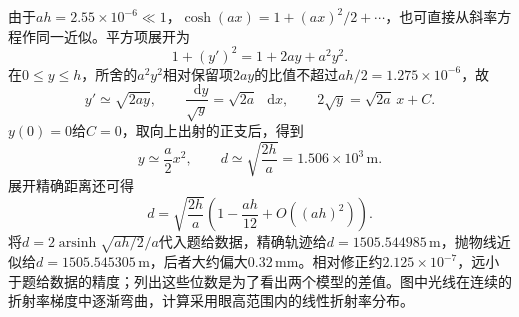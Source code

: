 \documentclass[UTF8,fontset=fandol,a4paper,11pt]{ctexart}
\newcommand{\dd}{\mathop{}\!\mathrm{d}}
\begin{document}
由于$ah=2.55\times10^{-6}\ll1$，$\cosh(ax)=1+(ax)^2/2+\cdots$，也可直接从斜率方程作同一近似。平方项展开为
\[
1+(y')^2=1+2ay+a^2y^2.
\]
在$0\le y\le h$，所舍的$a^2y^2$相对保留项$2ay$的比值不超过$ah/2=1.275\times10^{-6}$，故
\[
y'\simeq\sqrt{2ay},\qquad
\frac{\dd y}{\sqrt y}=\sqrt{2a}\,\dd x,\qquad
2\sqrt y=\sqrt{2a}\,x+C.
\]
$y(0)=0$给$C=0$，取向上出射的正支后，得到
\[
y\simeq\frac a2x^2,\qquad
\boxed{d\simeq\sqrt{\frac{2h}{a}}
=1.506\times10^3\,\mathrm m}.
\]
展开精确距离还可得
\[
d=\sqrt{\frac{2h}{a}}
\left(1-\frac{ah}{12}+O((ah)^2)\right).
\]
将$d=2\operatorname{arsinh}\sqrt{ah/2}/a$代入题给数据，精确轨迹给$d=1505.544985\,\mathrm{m}$，抛物线近似给$d=1505.545305\,\mathrm{m}$，后者大约偏大$0.32\,\mathrm{mm}$。相对修正约$2.125\times10^{-7}$，远小于题给数据的精度；列出这些位数是为了看出两个模型的差值。图中光线在连续的折射率梯度中逐渐弯曲，计算采用眼高范围内的线性折射率分布。\begin{center}\begin{minipage}{.97\linewidth}\centering
{}
\end{minipage}
\end{center}
\end{document}
